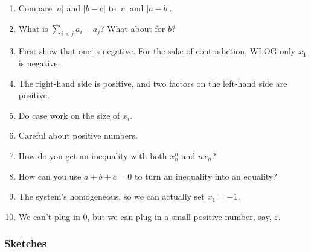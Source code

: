 \documentclass[11pt,paper=letter]{scrartcl}
\begin{document}
\begin{enumerate}
\item \label{h:6} Compare $|a|$ and $|b-c|$ to $|c|$ and $|a-b|$.
\item \label{h:10} What is $\sum_{i < j} a_i - a_j$? What about for $b$?
\item \label{h:8} First show that one is negative. For the sake of contradiction, WLOG only $x_1$ is negative.
\item \label{h:2} The right-hand side is positive, and two factors on the left-hand side are positive.
\item \label{h:4} Do case work on the size of $x_i$.
\item \label{h:1} Careful about positive numbers.
\item \label{h:3} How do you get an inequality with both $x^n_n$ and $nx_n$?
\item \label{h:5} How can you use $a + b + c = 0$ to turn an inequality into an equality?
\item \label{h:9} The system's homogeneous, so we can actually set $x_1 = -1$.
\item \label{h:7} We can't plug in $0$, but we can plug in a small positive number, say, $\varepsilon$.
\end{enumerate}

\subsubsection*{Sketches}
\end{document}
